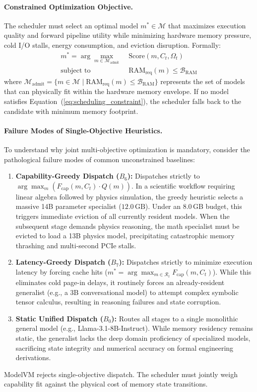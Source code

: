 \paragraph{Constrained Optimization Objective.}
The scheduler must select an optimal model $m^* \in \mathcal{M}$ that maximizes execution quality and forward pipeline utility while minimizing hardware memory pressure, cold I/O stalls, energy consumption, and eviction disruption. Formally:
\begin{align}
m^* = \arg\max_{m \in \mathcal{M}_{\text{admit}}} \;& \text{Score}(m, C_t, \Omega_t) \label{eq:scheduling_objective} \\
\text{subject to} \quad & \text{RAM}_{\text{req}}(m) \le \mathcal{B}_{\text{RAM}} \label{eq:scheduling_constraint}
\end{align}
where $\mathcal{M}_{\text{admit}} = \{m \in \mathcal{M} \mid \text{RAM}_{\text{req}}(m) \le \mathcal{B}_{\text{RAM}}\}$ represents the set of models that can physically fit within the hardware memory envelope. If no model satisfies Equation~(\ref{eq:scheduling_constraint}), the scheduler falls back to the candidate with minimum memory footprint.

\paragraph{Failure Modes of Single-Objective Heuristics.}
To understand why joint multi-objective optimization is mandatory, consider the pathological failure modes of common unconstrained baselines:
\begin{enumerate}
    \item \textbf{Capability-Greedy Dispatch ($B_6$):} Dispatches strictly to $\arg\max_m (F_{\text{cap}}(m, C_t) \cdot Q(m))$. In a scientific workflow requiring linear algebra followed by physics simulation, the greedy heuristic selects a massive 14B parameter specialist ($12.0\,\text{GB}$). Under an 8.0\,GB budget, this triggers immediate eviction of all currently resident models. When the subsequent stage demands physics reasoning, the math specialist must be evicted to load a 13B physics model, precipitating catastrophic memory thrashing and multi-second PCIe stalls.
    \item \textbf{Latency-Greedy Dispatch ($B_7$):} Dispatches strictly to minimize execution latency by forcing cache hits ($m^* = \arg\max_{m \in \mathcal{R}_t} F_{\text{cap}}(m, C_t)$). While this eliminates cold page-in delays, it routinely forces an already-resident generalist (e.g., a 3B conversational model) to attempt complex symbolic tensor calculus, resulting in reasoning failures and state corruption.
    \item \textbf{Static Unified Dispatch ($B_0$):} Routes all stages to a single monolithic general model (e.g., Llama-3.1-8B-Instruct). While memory residency remains static, the generalist lacks the deep domain proficiency of specialized models, sacrificing state integrity and numerical accuracy on formal engineering derivations.
\end{enumerate}
ModelVM rejects single-objective dispatch. The scheduler must jointly weigh capability fit against the physical cost of memory state transitions.

